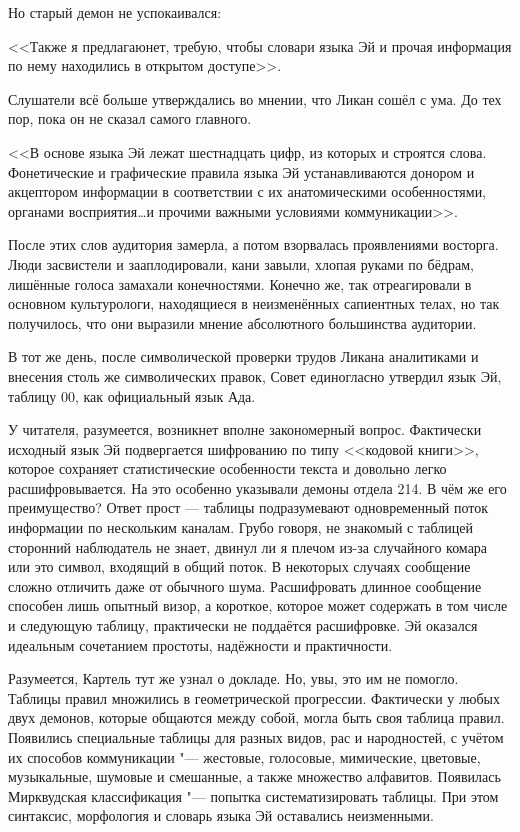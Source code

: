Но старый демон не успокаивался:

<<\ldotst Также я предлагаю\ldotst нет, требую, чтобы словари языка Эй и прочая информация по нему находились в открытом доступе>>.

Слушатели всё больше утверждались во мнении, что Ликан сошёл с ума.
До тех пор, пока он не сказал самого главного.

<<В основе языка Эй лежат шестнадцать цифр, из которых и строятся слова.
Фонетические и графические правила языка Эй устанавливаются донором и акцептором информации в соответствии с их анатомическими особенностями, органами восприятия\ldots и прочими важными условиями коммуникации>>.

После этих слов аудитория замерла, а потом взорвалась проявлениями восторга.
Люди засвистели и зааплодировали, кани завыли, хлопая руками по бёдрам, лишённые голоса замахали конечностями.
Конечно же, так отреагировали в основном культурологи, находящиеся в неизменённых сапиентных телах, но так получилось, что они выразили мнение абсолютного большинства аудитории.

В тот же день, после символической проверки трудов Ликана аналитиками и внесения столь же символических правок, Совет единогласно утвердил язык Эй, таблицу 00, как официальный язык Ада.

У читателя, разумеется, возникнет вполне закономерный вопрос.
Фактически исходный язык Эй подвергается шифрованию по типу <<кодовой книги>>, которое сохраняет статистические особенности текста и довольно легко расшифровывается.
На это особенно указывали демоны отдела 214.
В чём же его преимущество?
Ответ прост --- таблицы подразумевают одновременный поток информации по нескольким каналам.
Грубо говоря, не знакомый с таблицей сторонний наблюдатель не знает, двинул ли я плечом из-за случайного комара или это символ, входящий в общий поток.
В некоторых случаях сообщение сложно отличить даже от обычного шума.
Расшифровать длинное сообщение способен лишь опытный визор, а короткое, которое может содержать в том числе и следующую таблицу, практически не поддаётся расшифровке.
Эй оказался идеальным сочетанием простоты, надёжности и практичности.

Разумеется, Картель тут же узнал о докладе.
Но, увы, это им не помогло.
Таблицы правил множились в геометрической прогрессии.
Фактически у любых двух демонов, которые общаются между собой, могла быть своя таблица правил.
Появились специальные таблицы для разных видов, рас и народностей, с учётом их способов коммуникации "--- жестовые, голосовые, мимические, цветовые, музыкальные, шумовые и смешанные, а также множество алфавитов.
Появилась Мирквудская классификация "--- попытка систематизировать таблицы.
При этом синтаксис, морфология и словарь языка Эй оставались неизменными.

